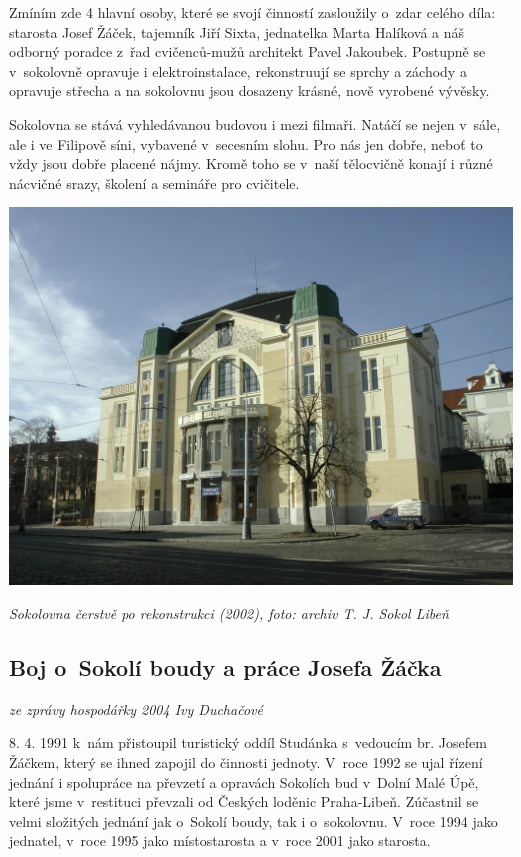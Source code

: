 \documentclass[a5paper, 11pt, twoside]{article}
\begin{document}
Zmíním zde 4 hlavní osoby, které se svojí činností zasloužily o~zdar
celého díla: starosta Josef Žáček, tajemník Jiří Sixta, jednatelka Marta
Halíková a náš odborný poradce z~řad cvičenců-mužů architekt Pavel
Jakoubek. Postupně se v~sokolovně opravuje i elektroinstalace,
rekonstruují se sprchy a záchody a opravuje střecha a na sokolovnu jsou
dosazeny krásné, nově vyrobené vývěsky.

Sokolovna se stává vyhledávanou budovou i mezi filmaři. Natáčí se nejen
v~sále, ale i ve Filipově síni, vybavené v~secesním slohu. Pro nás jen
dobře, neboť to vždy jsou dobře placené nájmy. Kromě toho se v~naší
tělocvičně konají i různé nácvičné srazy, školení a semináře pro
cvičitele.

 \includegraphics[width=\textwidth]{img/46_sokolovna.jpg}

\textit{Sokolovna čerstvě po rekonstrukci (2002), foto: archiv T. J. Sokol
Libeň}

\subsection{Boj o~Sokolí boudy a práce Josefa
Žáčka}

\textit{ze zprávy hospodářky 2004 Ivy Duchačové}

8. 4. 1991 k~nám přistoupil turistický oddíl Studánka s~vedoucím br.
Josefem Žáčkem, který se ihned zapojil do činnosti jednoty. V~roce 1992
se ujal řízení jednání i spolupráce na převzetí a opravách Sokolích bud
v~Dolní Malé Úpě, které jsme v~restituci převzali od Českých loděnic
Praha-Libeň. Zúčastnil se velmi složitých jednání jak o~Sokolí boudy,
tak i o~sokolovnu. V~roce 1994 jako jednatel, v~roce 1995 jako
místostarosta a v~roce 2001 jako starosta.
\end{document}
